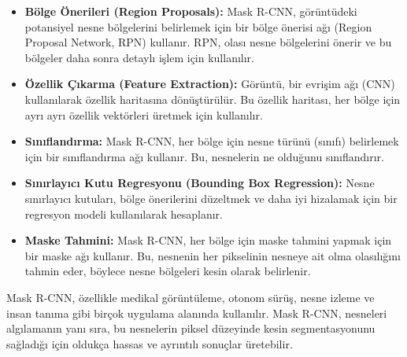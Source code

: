 \begin{itemize}
    \item \textbf{Bölge Önerileri (Region Proposals):} Mask R-CNN, görüntüdeki potansiyel nesne bölgelerini belirlemek için bir bölge önerisi ağı (Region Proposal Network, RPN) kullanır. RPN, olası nesne bölgelerini önerir ve bu bölgeler daha sonra detaylı işlem için kullanılır.
    \item \textbf{Özellik Çıkarma (Feature Extraction):} Görüntü, bir evrişim ağı (CNN) kullanılarak özellik haritasına dönüştürülür. Bu özellik haritası, her bölge için ayrı ayrı özellik vektörleri üretmek için kullanılır.
    \item \textbf{Sınıflandırma:} Mask R-CNN, her bölge için nesne türünü (sınıfı) belirlemek için bir sınıflandırma ağı kullanır. Bu, nesnelerin ne olduğunu sınıflandırır.
    \item \textbf{Sınırlayıcı Kutu Regresyonu (Bounding Box Regression):} Nesne sınırlayıcı kutuları, bölge önerilerini düzeltmek ve daha iyi hizalamak için bir regresyon modeli kullanılarak hesaplanır.
    \item \textbf{Maske Tahmini:} Mask R-CNN, her bölge için maske tahmini yapmak için bir maske ağı kullanır. Bu, nesnenin her pikselinin nesneye ait olma olasılığını tahmin eder, böylece nesne bölgeleri kesin olarak belirlenir.
\end{itemize}

Mask R-CNN, özellikle medikal görüntüleme, otonom sürüş, nesne izleme ve insan tanıma gibi birçok uygulama alanında kullanılır. Mask R-CNN, nesneleri algılamanın yanı sıra, bu nesnelerin piksel düzeyinde kesin segmentasyonunu sağladığı için oldukça hassas ve ayrıntılı sonuçlar üretebilir.

\newpage